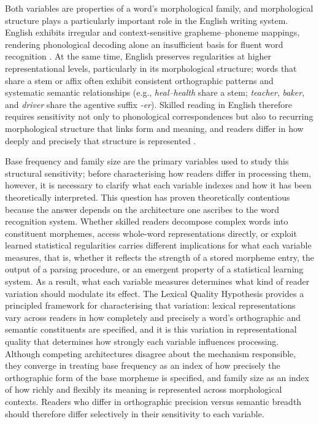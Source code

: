 	Both variables are properties of a word's morphological family, and morphological structure plays a particularly important role in the English writing system. English exhibits irregular and context-sensitive grapheme–phoneme mappings, rendering phonological decoding alone an insufficient basis for fluent word recognition \citep{zieglerReadingAcquisitionDevelopmental2005, castlesHowDoesOrthographic2006}. At the same time, English preserves regularities at higher representational levels, particularly in its morphological structure; words that share a stem or affix often exhibit consistent orthographic patterns and systematic semantic relationships (e.g., \textit{heal–health} share a stem; \textit{teacher}, \textit{baker}, and \textit{driver} share the agentive suffix \textit{-er}). Skilled reading in English therefore requires sensitivity not only to phonological correspondences but also to recurring morphological structure that links form and meaning, and readers differ in how deeply and precisely that structure is represented \citep{bryantMorphologySpellingWhat2005, arciuliReadingStatisticalLearning2018, treimanStatisticalLearningSpelling2018}.
	
	Base frequency and family size are the primary variables used to study this structural sensitivity; before characterising how readers differ in processing them, however, it is necessary to clarify what each variable indexes and how it has been theoretically interpreted. This question has proven theoretically contentious because the answer depends on the architecture one ascribes to the word recognition system. Whether skilled readers decompose complex words into constituent morphemes, access whole-word representations directly, or exploit learned statistical regularities carries different implications for what each variable measures, that is, whether it reflects the strength of a stored morpheme entry, the output of a parsing procedure, or an emergent property of a statistical learning system. As a result, what each variable measures determines what kind of reader variation should modulate its effect. The Lexical Quality Hypothesis \citep{perfettiLexicalQualityHypothesis2002, perfettiReadingAbilityLexical2007, perfettiLexicalQualityRevisited2017} provides a principled framework for characterising that variation: lexical representations vary across readers in how completely and precisely a word's orthographic and semantic constituents are specified, and it is this variation in representational quality that determines how strongly each variable influences processing. Although competing architectures disagree about the mechanism responsible, they converge in treating base frequency as an index of how precisely the orthographic form of the base morpheme is specified, and family size as an index of how richly and flexibly its meaning is represented across morphological contexts. Readers who differ in orthographic precision versus semantic breadth should therefore differ selectively in their sensitivity to each variable.
	
